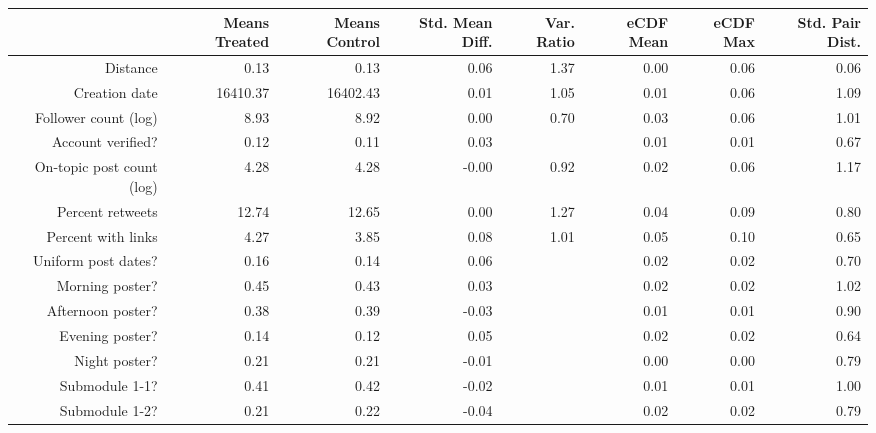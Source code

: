 \begin{table}[ht]
\centering
\begin{tabular}{rrrrrrrr}
  & Means Treated & Means Control & Std. Mean Diff. & Var. Ratio & eCDF Mean & eCDF Max & Std. Pair Dist. \\ 
  \hline
Distance & 0.13 & 0.13 & 0.06 & 1.37 & 0.00 & 0.06 & 0.06 \\ 
   \hline
Creation date & 16410.37 & 16402.43 & 0.01 & 1.05 & 0.01 & 0.06 & 1.09 \\ 
   \hline
Follower count (log) & 8.93 & 8.92 & 0.00 & 0.70 & 0.03 & 0.06 & 1.01 \\ 
   \hline
Account verified? & 0.12 & 0.11 & 0.03 &  & 0.01 & 0.01 & 0.67 \\ 
   \hline
On-topic post count (log) & 4.28 & 4.28 & -0.00 & 0.92 & 0.02 & 0.06 & 1.17 \\ 
   \hline
Percent retweets & 12.74 & 12.65 & 0.00 & 1.27 & 0.04 & 0.09 & 0.80 \\ 
   \hline
Percent with links & 4.27 & 3.85 & 0.08 & 1.01 & 0.05 & 0.10 & 0.65 \\ 
   \hline
Uniform post dates? & 0.16 & 0.14 & 0.06 &  & 0.02 & 0.02 & 0.70 \\ 
   \hline
Morning poster? & 0.45 & 0.43 & 0.03 &  & 0.02 & 0.02 & 1.02 \\ 
   \hline
Afternoon poster? & 0.38 & 0.39 & -0.03 &  & 0.01 & 0.01 & 0.90 \\ 
   \hline
Evening poster? & 0.14 & 0.12 & 0.05 &  & 0.02 & 0.02 & 0.64 \\ 
   \hline
Night poster? & 0.21 & 0.21 & -0.01 &  & 0.00 & 0.00 & 0.79 \\ 
   \hline
Submodule 1-1? & 0.41 & 0.42 & -0.02 &  & 0.01 & 0.01 & 1.00 \\ 
   \hline
Submodule 1-2? & 0.21 & 0.22 & -0.04 &  & 0.02 & 0.02 & 0.79 \\ 
   \hline
\end{tabular}
\end{table}
